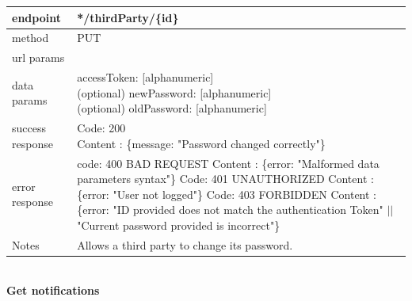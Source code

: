 \begin{legal}
\begin{legal}
\begin{itemize}
							\begin{tabularx}{\linewidth}{| l | l |}
								\hline
								endpoint & */thirdParty/\{id\} \\
								\hline
								method & PUT \\
								\hline
								url params & \\
								\hline
								data params & 
								\parbox{0.7\textwidth}{
									\bigskip
									accessToken: [alphanumeric] \\
									(optional) newPassword: [alphanumeric]\\
									(optional) oldPassword:
									[alphanumeric]\\
									\bigskip
								} \\
								\hline
								success response &
								\parbox{0.7\textwidth}{
									\bigskip
									Code: 200\\
									Content : \{message: "Password changed correctly"\}
									\bigskip
								} \\
								\hline
								error response &
								\parbox{0.7\textwidth}{
									\bigskip
									code: 400 BAD REQUEST \\
									Content : \{error: "Malformed data parameters syntax"\}\\
									Code: 401 UNAUTHORIZED \\
									Content : \{error: "User not logged"\}\\
									Code: 403 FORBIDDEN \\
									Content : \{error: "ID provided does not match the authentication Token" $||$  "Current password provided is incorrect"\}\\
									\bigskip
								} \\
								\hline
								Notes & \parbox{0.7\textwidth}{
									\bigskip
									Allows a third party to change its password.
									\bigskip
								} \\
								\hline
							\end{tabularx}\\
							
							\textbf{Get notifications} \\
			

\end{itemize}
\end{legal}
\end{legal}
